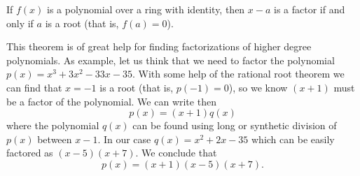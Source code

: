 \documentclass[12pt]{article}
\begin{document}
If $f(x)$ is a polynomial over a ring with identity, then $x-a$ is a factor if and only if $a$ is a root (that is, $f(a)=0$).

This theorem is of great help for finding factorizations of higher degree polynomials. As example, let us think that we need to factor the polynomial $p(x)=x^3+3x^2-33x-35$. With some help of the rational root theorem we can find that $x=-1$ is a root (that is, $p(-1)=0$), so we know $(x+1)$ must be a factor of the polynomial. We can write then
$$p(x)=(x+1)q(x)$$
where the polynomial $q(x)$ can be found using long or synthetic division of $p(x)$ between $x-1$. In our case $q(x)=x^2+2x-35$ which can be easily factored as $(x-5)(x+7)$. We conclude that
$$p(x)=(x+1)(x-5)(x+7).$$
\end{document}
